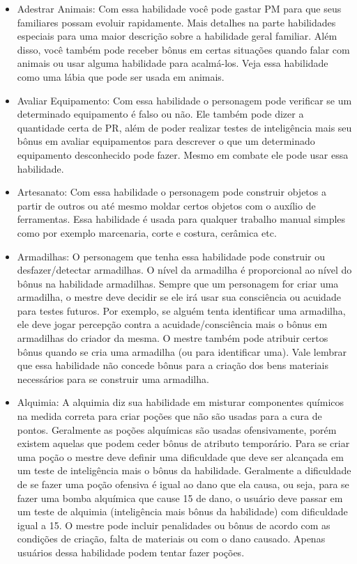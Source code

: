\begin{itemize}
	\item Adestrar Animais: Com essa habilidade você pode gastar PM para que seus familiares possam evoluir rapidamente. Mais detalhes na parte habilidades especiais para uma maior descrição sobre a habilidade geral familiar. Além disso, você também pode receber bônus em certas situações quando falar com animais ou usar alguma habilidade para acalmá-los. Veja essa habilidade como uma lábia que pode ser usada em animais.
	
	\item Avaliar Equipamento: Com essa habilidade o personagem pode verificar se um determinado equipamento é falso ou não. Ele também pode dizer a quantidade certa de PR, além de poder realizar testes de inteligência mais seu bônus em avaliar equipamentos para descrever o que um determinado equipamento desconhecido pode fazer. Mesmo em combate ele pode usar essa habilidade.
	
	\item Artesanato: Com essa habilidade o personagem pode construir objetos a partir de outros ou até mesmo moldar certos objetos com o auxílio de ferramentas. Essa habilidade é usada para qualquer trabalho manual simples como por exemplo marcenaria, corte e costura, cerâmica etc.
	
	\item Armadilhas: O personagem que tenha essa habilidade pode construir ou desfazer/detectar armadilhas. O nível da armadilha é proporcional ao nível do bônus na habilidade armadilhas. Sempre que um personagem for criar uma armadilha, o mestre deve decidir se ele irá usar sua consciência ou acuidade para testes futuros. Por exemplo, se alguém tenta identificar uma armadilha, ele deve jogar percepção contra a acuidade/consciência mais o bônus em armadilhas do criador da mesma. O mestre também pode atribuir certos bônus quando se cria uma armadilha (ou para identificar uma). Vale lembrar que essa habilidade não concede bônus para a criação dos bens materiais necessários para se construir uma armadilha.  
	
	\item Alquimia: A alquimia diz sua habilidade em misturar componentes químicos na medida correta para criar poções que não são usadas para a cura de pontos. Geralmente as poções alquímicas são usadas ofensivamente, porém existem aquelas que podem ceder bônus de atributo temporário. Para se criar uma poção o mestre deve definir uma dificuldade que deve ser alcançada em um teste de inteligência mais o bônus da habilidade. Geralmente a dificuldade de se fazer uma poção ofensiva é igual ao dano que ela causa, ou seja, para se fazer uma bomba alquímica que cause 15 de dano, o usuário deve passar em um teste de alquimia (inteligência mais bônus da habilidade) com dificuldade igual a 15. O mestre pode incluir penalidades ou bônus de acordo com as condições de criação, falta de materiais ou com o dano causado. Apenas usuários dessa habilidade podem tentar fazer poções.  
	

\end{itemize}
